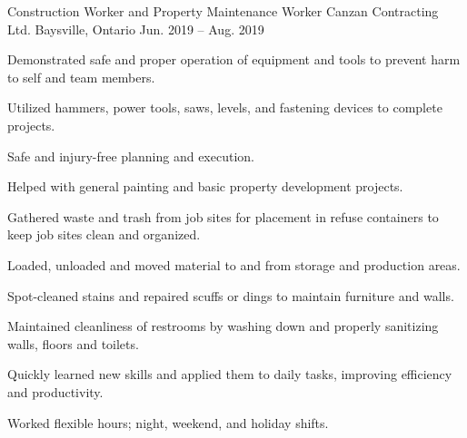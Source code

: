 \begin{cventries}
  \cventry
    {Construction Worker and Property Maintenance Worker} %
    {Canzan Contracting Ltd.} %
    {Baysville, Ontario} %
    {Jun. 2019 -- Aug. 2019} %
    {
      \begin{cvitems} %
        \item {Demonstrated safe and proper operation of equipment and tools to prevent harm to self and team members.}
        \item {Utilized hammers, power tools, saws, levels, and fastening devices to complete projects.}
        \item {Safe and injury-free planning and execution.}
        \item {Helped with general painting and basic property development projects.}
        \item {Gathered waste and trash from job sites for placement in refuse containers to keep job sites clean and organized.}
        \item {Loaded, unloaded and moved material to and from storage and production areas.}
        \item {Spot-cleaned stains and repaired scuffs or dings to maintain furniture and walls.}
        \item {Maintained cleanliness of restrooms by washing down and properly sanitizing walls, floors and toilets.}
        \item {Quickly learned new skills and applied them to daily tasks, improving efficiency and productivity.}
        \item {Worked flexible hours; night, weekend, and holiday shifts.}
      \end{cvitems}
    }
\end{cventries}

